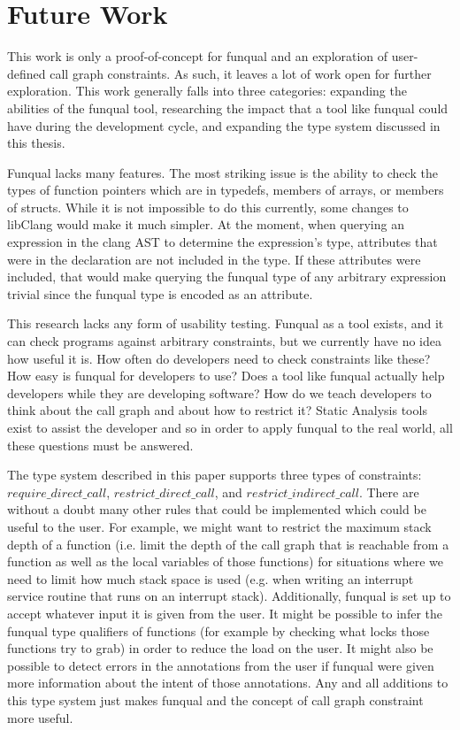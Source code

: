 \chapter{Future Work}\label{sec:future}

This work is only a proof-of-concept for funqual and an exploration of user-defined call graph constraints.  As such, it leaves a lot of work open for further exploration.  This work generally falls into three categories: expanding the abilities of the funqual tool, researching the impact that a tool like funqual could have during the development cycle, and expanding the type system discussed in this thesis.  

Funqual lacks many features.  The most striking issue is the ability to check the types of function pointers which are in typedefs, members of arrays, or members of structs.  While it is not impossible to do this currently, some changes to libClang would make it much simpler.  At the moment, when querying an expression in the clang AST to determine the expression's type, attributes that were in the declaration are not included in the type.  If these attributes were included, that would make querying the funqual type of any arbitrary expression trivial since the funqual type is encoded as an attribute.  

This research lacks any form of usability testing.  Funqual as a tool exists, and it can check programs against arbitrary constraints, but we currently have no idea how useful it is.  How often do developers need to check constraints like these?  How easy is funqual for developers to use?  Does a tool like funqual actually help developers while they are developing software?  How do we teach developers to think about the call graph and about how to restrict it?  Static Analysis tools exist to assist the developer and so in order to apply funqual to the real world, all these questions must be answered.

The type system described in this paper supports three types of constraints: $require\_direct\_call$, $restrict\_direct\_call$, and $restrict\_indirect\_call$.  There are without a doubt many other rules that could be implemented which could be useful to the user.  For example, we might want to restrict the maximum stack depth of a function (i.e. limit the depth of the call graph that is reachable from a function as well as the local variables of those functions) for situations where we need to limit how much stack space is used (e.g. when writing an interrupt service routine that runs on an interrupt stack).  Additionally, funqual is set up to accept whatever input it is given from the user.  It might be possible to infer the funqual type qualifiers of functions (for example by checking what locks those functions try to grab) in order to reduce the load on the user.  It might also be possible to detect errors in the annotations from the user if funqual were given more information about the intent of those annotations.  Any and all additions to this type system just makes funqual and the concept of call graph constraint more useful.

